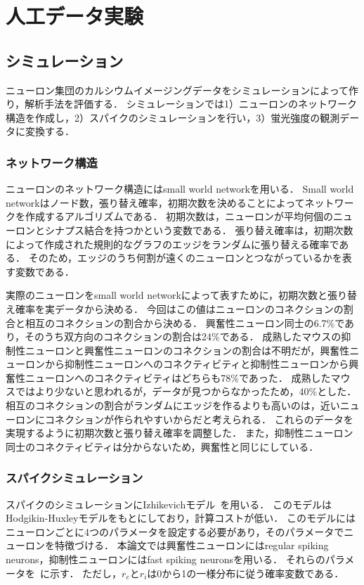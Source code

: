 \chapter{人工データ実験}
\section{シミュレーション}
ニューロン集団のカルシウムイメージングデータをシミュレーションによって作り，解析手法を評価する．
シミュレーションでは1）ニューロンのネットワーク構造を作成し，2）スパイクのシミュレーションを行い，3）蛍光強度の観測データに変換する．
\subsection{ネットワーク構造}
ニューロンのネットワーク構造にはsmall world network\cite{Watts1998}を用いる．
Small world networkはノード数，張り替え確率，初期次数を決めることによってネットワークを作成するアルゴリズムである．
初期次数は，ニューロンが平均何個のニューロンとシナプス結合を持つかという変数である．
張り替え確率は，初期次数によって作成された規則的なグラフのエッジをランダムに張り替える確率である．
そのため，エッジのうち何割が遠くのニューロンとつながっているかを表す変数である．

実際のニューロンをsmall world networkによって表すために，初期次数と張り替え確率を実データから決める．
今回はこの値はニューロンのコネクションの割合と相互のコネクションの割合から決める．
興奮性ニューロン同士の6.7\%であり，そのうち双方向のコネクションの割合は24\%である\cite{}．
成熟したマウスの抑制性ニューロンと興奮性ニューロンのコネクションの割合は不明だが，興奮性ニューロンから抑制性ニューロンへのコネクティビティと抑制性ニューロンから興奮性ニューロンへのコネクティビティはどちらも78\%であった\cite{Holmgren2003}．
成熟したマウスではより少ないと思われるが，データが見つからなかったため，40\%とした．
相互のコネクションの割合がランダムにエッジを作るよりも高いのは，近いニューロンにコネクションが作られやすいからだと考えられる．
これらのデータを実現するように初期次数と張り替え確率を調整した．
また，抑制性ニューロン同士のコネクティビティは分からないため，興奮性と同じにしている．
\subsection{スパイクシミュレーション}
スパイクのシミュレーションにIzhikevichモデル~\cite{Izhikevich2003}を用いる．
このモデルはHodgikin-Huxleyモデルをもとにしており，計算コストが低い．
このモデルにはニューロンごとに4つのパラメータを設定する必要があり，そのパラメータでニューロンを特徴づける．
本論文では興奮性ニューロンにはregular spiking neurons，抑制性ニューロンにはfast spiking neuronsを用いる．
それらのパラメータを~に示す．
ただし，$r_e$と$r_i$は0から1の一様分布に従う確率変数である．

